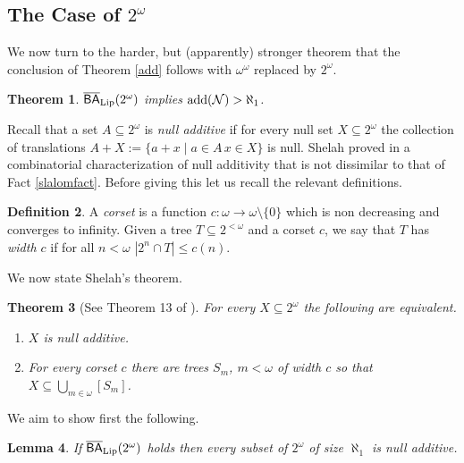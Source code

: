 \documentclass[leqno,11pt]{amsart}
\newtheorem{theorem}{Theorem}[section]
\newtheorem{lemma}[theorem]{Lemma}
\theoremstyle{definition}
\newtheorem{definition}[theorem]{Definition}
\theoremstyle{remark}
\def\Null{\mathcal N}
\def\BA{\mathsf{BA}}
\def\baire{\omega^\omega}
\def\cantor{2^\omega}
\def\add{{\rm add}}
\begin{document}
\subsection{The Case of $\cantor$}
We now turn to the harder, but (apparently) stronger theorem that the conclusion of Theorem \ref{add} follows with $\baire$ replaced by $\cantor$.
\begin{theorem}
    $\overline{\BA}_{\rm Lip}(\cantor)$ implies $\add(\Null) > \aleph_1$. \label{add2}
\end{theorem}
Recall that a set $A \subseteq 2^\omega$ is {\em null additive} if for every null set $X \subseteq 2^\omega$ the collection of translations $A + X:= \{a + x\; | \; a \in A \, x \in X\}$ is null. Shelah proved in \cite{nulladditive} a combinatorial characterization of null additivity that is not dissimilar to that of Fact \ref{slalomfact}. Before giving this let us recall the relevant definitions. 
\begin{definition}
    A {\em corset} is a function $c:\omega \to \omega \setminus \{0\}$ which is non decreasing and converges to infinity. Given a tree $T \subseteq 2^{< \omega}$ and a corset $c$, we say that $T$ has {\em width $c$} if for all $n < \omega$ $|2^n \cap T| \leq c(n)$. %
\end{definition}

We now state Shelah's theorem.
\begin{theorem}[See Theorem 13 of \cite{nulladditive}] \label{shelahnulladditive}
   For every $X \subseteq \cantor$ the following are equivalent.
   \begin{enumerate}
       \item $X$ is null additive.
       \item For every corset $c$ there are trees $S_m$, $m < \omega$ of width $c$ so that $X \subseteq \bigcup_{m \in \omega} [S_m]$. 
   \end{enumerate}
\end{theorem}

We aim to show first the following. 
\begin{lemma}
    If $\overline{\BA}_{\rm Lip}(2^\omega)$ holds then every subset of $2^\omega$ of size $\aleph_1$ is null additive. 
\end{lemma}
\end{document}
